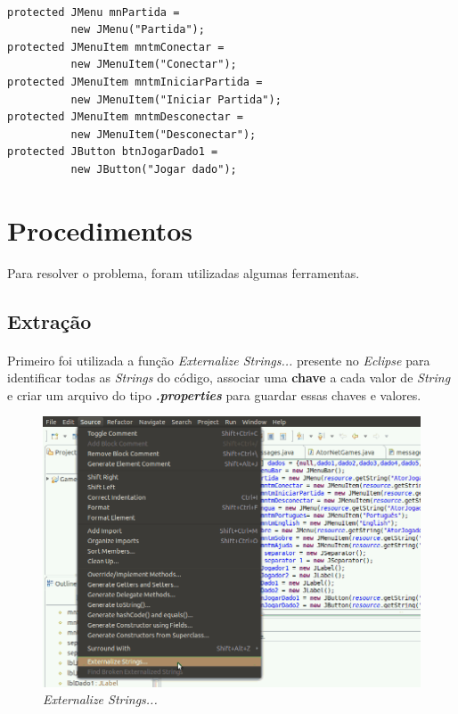 \documentclass[a4paper, 12pt]{article}
\begin{document}
\begin{lstlisting}[frame=single, caption={Código anterior},
  captionpos=b]

protected JMenu mnPartida = 
          new JMenu("Partida");
protected JMenuItem mntmConectar = 
          new JMenuItem("Conectar");
protected JMenuItem mntmIniciarPartida = 
          new JMenuItem("Iniciar Partida");
protected JMenuItem mntmDesconectar = 
          new JMenuItem("Desconectar");
protected JButton btnJogarDado1 = 
          new JButton("Jogar dado");

\end{lstlisting}

\section{Procedimentos} \label{procedimentos}
Para resolver o problema, foram utilizadas algumas ferramentas.

\FloatBarrier
\subsection{Extração} \label{extraction}

\paragraph{} Primeiro foi utilizada a função \emph{Externalize
  Strings...} presente no \emph{Eclipse} para identificar todas as
\emph{Strings} do código, associar uma {\bf chave} a cada valor de
\emph{String} e criar um arquivo do tipo {\bf \emph{.properties}} para
guardar essas chaves e valores.

\begin{figure}[h!]
\centering
\includegraphics[width=\textwidth]{Screenshot-externalize.png}
\caption{\emph{Externalize Strings...}}
\end{figure}
\end{document}
